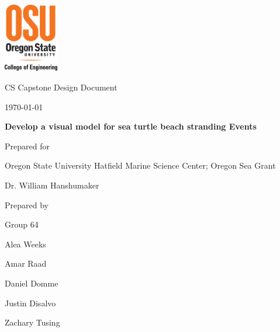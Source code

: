 \documentclass[onecolumn, draftclsnofoot,10pt, compsoc]{IEEEtran}
\def \CapstoneTeamName{		Beached Marine Critters Project Team}
\def \CapstoneTeamNumber{		64}
\def \GroupMemberOne{			Alea Weeks}
\def \GroupMemberTwo{			Amar Raad}
\def \GroupMemberThree{			Daniel Domme}
\def \GroupMemberFour{			Justin Disalvo}
\def \GroupMemberFive{			Zachary Tusing}
\def \CapstoneProjectName{		Develop a visual model for sea turtle beach stranding Events}
\def \CapstoneSponsorCompany{	Oregon State University Hatfield Marine Science Center; Oregon Sea Grant}
\def \CapstoneSponsorPerson{		Dr. William Hanshumaker}
\def \DocType{		%
				Design Document
				}
\newcommand{\NameSigPair}[1]{\par
\makebox[2.75in][r]{#1} \hfil 	\makebox[3.25in]{\makebox[2.25in]{\hrulefill} \hfill		\makebox[.75in]{\hrulefill}}
\par\vspace{-12pt} \textit{\tiny\noindent
\makebox[2.75in]{} \hfil		\makebox[3.25in]{\makebox[2.25in][r]{Signature} \hfill	\makebox[.75in][r]{Date}}}}
\renewcommand{\NameSigPair}[1]{#1}
\begin{document}
\begin{titlepage}
    \begin{singlespace}
     \includegraphics[height=3cm]{coe_v_spot1}
        \hfill 
        \par\vspace{.2in}
        \centering
        \scshape{
            \huge CS Capstone \DocType \par
            {\normalsize\today}\par
            \vspace{.5in}
            \textbf{\Huge\CapstoneProjectName}\par
            \vspace{1in}
            {\Large Prepared for}\par
            \huge \CapstoneSponsorCompany\par
            \vspace{5pt}
            {\Large\NameSigPair{\CapstoneSponsorPerson}\par}
            \vspace{.5in}
            {\large Prepared by }\par
            Group\CapstoneTeamNumber\par
            \vspace{5pt}
            {\Large
                \NameSigPair{\GroupMemberOne}\par
                \NameSigPair{\GroupMemberTwo}\par
                \NameSigPair{\GroupMemberThree}\par
				\NameSigPair{\GroupMemberFour}\par
			\NameSigPair{\GroupMemberFive}\par
            }
            \vspace{20pt}
        }
        \vfill
        \begin{abstract}

\end{abstract}
\end{singlespace}
\end{titlepage}
\end{document}
